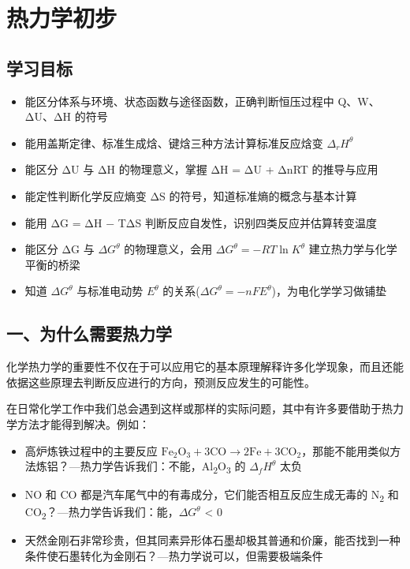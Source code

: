 \section{热力学初步}\label{ux70edux529bux5b66ux521dux6b65}

\subsection{学习目标}\label{ux5b66ux4e60ux76eeux6807}

\begin{itemize}
\tightlist
\item
  能区分体系与环境、状态函数与途径函数，正确判断恒压过程中 Q、W、ΔU、ΔH 的符号
\item
  能用盖斯定律、标准生成焓、键焓三种方法计算标准反应焓变 \(\Delta_r H^\theta\)
\item
  能区分 ΔU 与 ΔH 的物理意义，掌握 ΔH = ΔU + ΔnRT 的推导与应用
\item
  能定性判断化学反应熵变 ΔS 的符号，知道标准熵的概念与基本计算
\item
  能用 ΔG = ΔH − TΔS 判断反应自发性，识别四类反应并估算转变温度
\item
  能区分 ΔG 与 \(\Delta G^\theta\) 的物理意义，会用 \(\Delta G^\theta = -RT \ln K^\theta\) 建立热力学与化学平衡的桥梁
\item
  知道 \(\Delta G^\theta\) 与标准电动势 \(E^\theta\) 的关系(\(\Delta G^\theta = -nFE^\theta\))，为电化学学习做铺垫
\end{itemize}

\subsection{一、为什么需要热力学}\label{ux4e00ux4e3aux4ec0ux4e48ux9700ux8981ux70edux529bux5b66}

化学热力学的重要性不仅在于可以应用它的基本原理解释许多化学现象，而且还能依据这些原理去判断反应进行的方向，预测反应发生的可能性。

在日常化学工作中我们总会遇到这样或那样的实际问题，其中有许多要借助于热力学方法才能得到解决。例如：

\begin{itemize}
\tightlist
\item
  高炉炼铁过程中的主要反应 \(\mathrm{Fe_2O_3 + 3CO \to 2Fe + 3CO_2}\)，那能不能用类似方法炼铝？---热力学告诉我们：不能，Al\textsubscript{2}O\textsubscript{3} 的 \(\Delta_f H^\theta\) 太负
\item
  NO 和 CO 都是汽车尾气中的有毒成分，它们能否相互反应生成无毒的 N\textsubscript{2} 和 CO\textsubscript{2}？---热力学告诉我们：能，\(\Delta G^\theta\) \textless{} 0
\item
  天然金刚石非常珍贵，但其同素异形体石墨却极其普通和价廉，能否找到一种条件使石墨转化为金刚石？---热力学说可以，但需要极端条件
\end{itemize}

